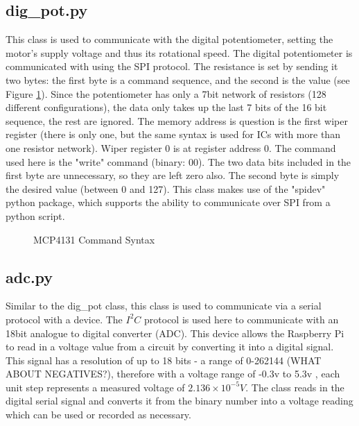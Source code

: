 \documentclass[a4]{report}
\begin{document}
	\subsection{dig\_pot.py}
	This class is used to communicate with the digital potentiometer, setting the motor's supply voltage and thus its rotational speed. The digital potentiometer is communicated with using the SPI protocol. The resistance is set by sending it two bytes: the first byte is a command sequence, and the second is the value (see Figure \ref{mcp4131commfig}). Since the potentiometer has only a 7bit network of resistors (128 different configurations), the data only takes up the last 7 bits of the 16 bit sequence, the rest are ignored. The memory address is question is the first wiper register (there is only one, but the same syntax is used for ICs with more than one resistor network). Wiper register 0 is at register address 0. The command used here is the "write" command (binary: 00). The two data bits included in the first byte are unnecessary, so they are left zero also. The second byte is simply the desired value (between 0 and 127). \newline \newline \noindent
	This class makes use of the "spidev" python package, which supports the ability to communicate over SPI from a python script.
	\begin{figure}[!h]
		\centering
		\caption{MCP4131 Command Syntax \cite[p.~47]{mcp4131datasheet}}
		\label{mcp4131commfig}
	\end{figure} \newline  \noindent
	
	\subsection{adc.py}
	Similar to the dig\_pot class, this class is used to communicate via a serial protocol with a device. The \(I^2C\) protocol is used here to communicate with an 18bit analogue to digital converter (ADC). This device allows the Raspberry Pi to read in a voltage value from a circuit by converting it into a digital signal. This signal has a resolution of up to 18 bits - a range of 0-262144 (WHAT ABOUT NEGATIVES?), therefore with a voltage range of -0.3v to 5.3v \cite{mcp3424datasheet}, each unit step represents a measured voltage of \(2.136\times10^{-5}V\). The class reads in the digital serial signal and converts it from the binary number into a voltage reading which can be used or recorded as necessary.
\end{document}

